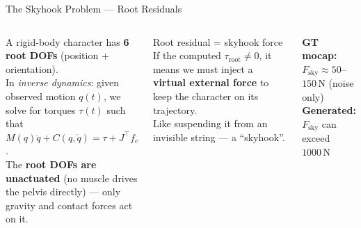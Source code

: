 \documentclass[aspectratio=169, 10pt]{beamer}
\begin{document}

\begin{frame}{The Skyhook Problem --- Root Residuals}
  \begin{columns}[T]
      A rigid-body character has \textbf{6 root DOFs} (position + orientation).\\[0.5em]

      In \emph{inverse dynamics}: given observed motion $q(t)$, we solve for torques $\tau(t)$
      such that $M(q)\ddot{q} + C(q,\dot{q}) = \tau + J^\top f_c$.\\[0.5em]

      The \textbf{root DOFs are unactuated} (no muscle drives the pelvis directly) ---
      only gravity and contact forces act on it.\\[0.5em]

      \begin{alertblock}{Root residual = skyhook force}
        If the computed $\tau_\text{root} \neq 0$, it means we must inject
        a \textbf{virtual external force} to keep the character on its trajectory.\\
        Like suspending it from an invisible string --- a ``skyhook''.
      \end{alertblock}


      \vspace{0.4em}
      \small
      \textbf{GT mocap:} $F_\text{sky} \approx 50$--$150\,\text{N}$ (noise only)\\
      \textbf{Generated:} $F_\text{sky}$ can exceed $1000\,\text{N}$
  \end{columns}
\end{frame}
\end{document}
